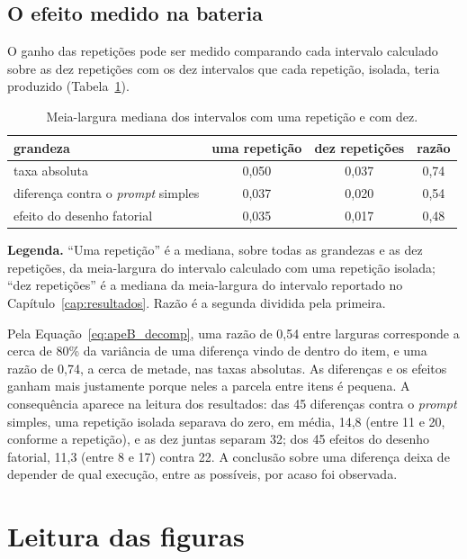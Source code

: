 \subsection*{O efeito medido na bateria}

O ganho das repetições pode ser medido comparando cada intervalo calculado
sobre as dez repetições com os dez intervalos que cada repetição, isolada,
teria produzido (Tabela~\ref{tab:apeB_ganho}).

\begin{table}[H]
\centering
\caption{Meia-largura mediana dos intervalos com uma repetição e com dez.}
\label{tab:apeB_ganho}
\begin{tabular}{lccc}
\toprule
grandeza & uma repetição & dez repetições & razão \\
\midrule
taxa absoluta & 0,050 & 0,037 & 0,74 \\
diferença contra o \textit{prompt} simples & 0,037 & 0,020 & 0,54 \\
efeito do desenho fatorial & 0,035 & 0,017 & 0,48 \\
\bottomrule
\end{tabular}
\vspace{2pt}
\begin{minipage}{\textwidth}
\footnotesize\raggedright
\textbf{Legenda.} ``Uma repetição'' é a mediana, sobre todas as grandezas e
as dez repetições, da meia-largura do intervalo calculado com uma repetição
isolada; ``dez repetições'' é a mediana da meia-largura do intervalo
reportado no Capítulo~\ref{cap:resultados}. Razão é a segunda dividida pela
primeira.
\end{minipage}
\end{table}

Pela Equação~\eqref{eq:apeB_decomp}, uma razão de 0,54 entre larguras
corresponde a cerca de 80\% da variância de uma diferença vindo de dentro do
item, e uma razão de 0,74, a cerca de metade, nas taxas absolutas. As
diferenças e os efeitos ganham mais justamente porque neles a parcela entre
itens é pequena. A consequência aparece na leitura dos resultados: das 45
diferenças contra o \textit{prompt} simples, uma repetição isolada separava
do zero, em média, 14,8 (entre 11 e 20, conforme a repetição), e as dez
juntas separam 32; dos 45 efeitos do desenho fatorial, 11,3 (entre 8 e 17)
contra 22. A conclusão sobre uma diferença deixa de depender de qual
execução, entre as possíveis, por acaso foi observada.

\section{Leitura das figuras}\label{sec:apeB_leitura}

